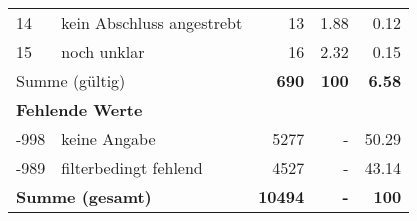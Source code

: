 \begin{longtable}{lXrrr}
     14 &
     \multicolumn{1}{X}{ kein Abschluss angestrebt   } &


       \num{13} &
       \num[round-mode=places,round-precision=2]{1,88} &
         \num[round-mode=places,round-precision=2]{0,12} \\

     15 &
     \multicolumn{1}{X}{ noch unklar   } &


       \num{16} &
       \num[round-mode=places,round-precision=2]{2,32} &
         \num[round-mode=places,round-precision=2]{0,15} \\
     \midrule
     \multicolumn{2}{l}{Summe (gültig)} &
       \textbf{\num{690}} &
     \textbf{100} &
       \textbf{\num[round-mode=places,round-precision=2]{6,58}} \\
     \multicolumn{5}{l}{\textbf{Fehlende Werte}}\\
       -998 &
       keine Angabe &
         \num{5277} &
        - &
         \num[round-mode=places,round-precision=2]{50,29} \\
       -989 &
       filterbedingt fehlend &
         \num{4527} &
        - &
         \num[round-mode=places,round-precision=2]{43,14} \\
     \midrule
     \multicolumn{2}{l}{\textbf{Summe (gesamt)}} &
          \textbf{\num{10494}} &
        \textbf{-} &
        \textbf{100} \\
     \bottomrule
     \end{longtable}
     
